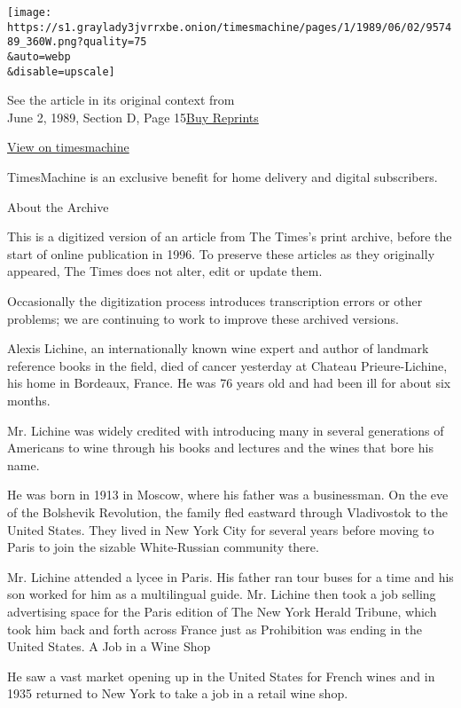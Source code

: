 \texttt{[image: https://s1.graylady3jvrrxbe.onion/timesmachine/pages/1/1989/06/02/957489\_360W.png?quality=75\\\&auto=webp\\\&disable=upscale]}

See the article in its original context from\\
June 2, 1989, Section D, Page
15\href{https://store.nytimes3xbfgragh.onion/collections/new-york-times-page-reprints?utm_source=nytimes\&utm_medium=article-page\&utm_campaign=reprints}{Buy
Reprints}

\href{http://timesmachine.nytimes3xbfgragh.onion/timesmachine/1989/06/02/957489.html}{View
on timesmachine}

TimesMachine is an exclusive benefit for home delivery and digital
subscribers.

About the Archive

This is a digitized version of an article from The Times's print
archive, before the start of online publication in 1996. To preserve
these articles as they originally appeared, The Times does not alter,
edit or update them.

Occasionally the digitization process introduces transcription errors or
other problems; we are continuing to work to improve these archived
versions.

Alexis Lichine, an internationally known wine expert and author of
landmark reference books in the field, died of cancer yesterday at
Chateau Prieure-Lichine, his home in Bordeaux, France. He was 76 years
old and had been ill for about six months.

Mr. Lichine was widely credited with introducing many in several
generations of Americans to wine through his books and lectures and the
wines that bore his name.

He was born in 1913 in Moscow, where his father was a businessman. On
the eve of the Bolshevik Revolution, the family fled eastward through
Vladivostok to the United States. They lived in New York City for
several years before moving to Paris to join the sizable White-Russian
community there.

Mr. Lichine attended a lycee in Paris. His father ran tour buses for a
time and his son worked for him as a multilingual guide. Mr. Lichine
then took a job selling advertising space for the Paris edition of The
New York Herald Tribune, which took him back and forth across France
just as Prohibition was ending in the United States. A Job in a Wine
Shop

He saw a vast market opening up in the United States for French wines
and in 1935 returned to New York to take a job in a retail wine shop.


